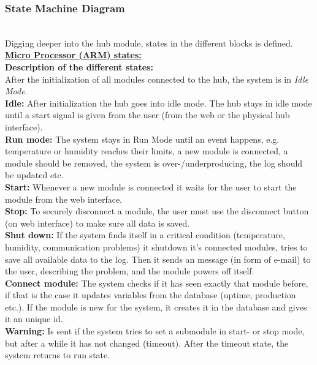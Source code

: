 \subsubsection{State Machine Diagram}\textbf{ }\\
Digging deeper into the hub module, states in the different blocks is defined. 
\\[0.2cm] \underline{\textbf{Micro Processor (ARM) states:}}
\\[0.2cm] \textbf{Description of the different states: }
	\\ After the initialization of all modules connected to the hub, the system is in  \textit{Idle Mode}.
	\\\textbf{Idle: } After initialization the hub goes into idle mode. The hub stays in idle mode until a start signal is given from the user (from the web or the physical hub interface). 
	\\\textbf{Run mode: }The system stays in Run Mode until an event happens, e.g. temperature or humidity reaches their limits, a new module is connected, a module should be removed, the system is over-/underproducing, the log should be updated etc.
	\\\textbf{Start: }Whenever a new module is connected it waits for the user to start the module from the web interface.
	\\\textbf{Stop: }To securely disconnect a module, the user must use the disconnect button (on web interface) to make sure all data is saved.
	\\\textbf{Shut down: }If the system finds itself in a critical condition (temperature, humidity, communication problems) it shutdown it's connected modules, tries to save all available data to the log. Then it sends an message (in form of e-mail) to the user, describing the problem, and the module powers off itself. 
	\\\textbf{Connect module: } The system checks if it has seen exactly that module before, if that is the case it updates variables from the database (uptime, production etc.). If the module is new for the system, it creates it in the database and gives it an unique id.
	\\\textbf{Warning: }Is sent if the system tries to set a submodule in start- or stop mode, but after a while it has not changed (timeout). After the timeout state, the system returns to run state.
